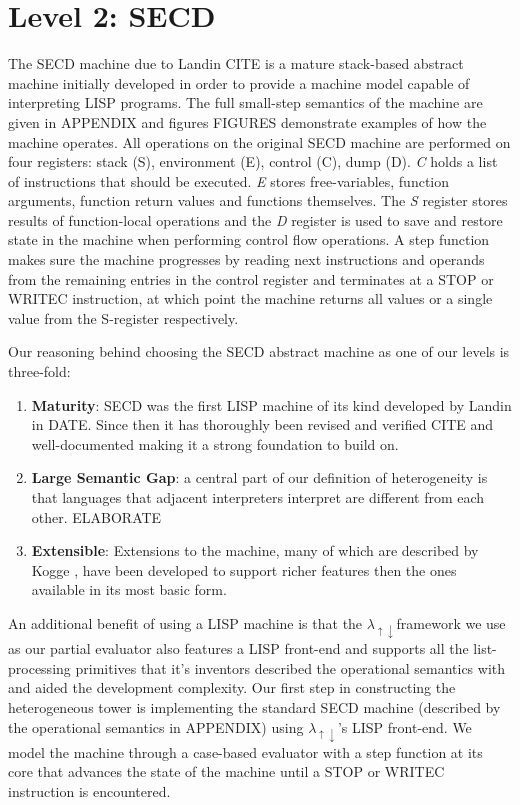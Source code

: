 \documentclass{article}
\theoremstyle{definition}
\newcommand{\mslang}{$\lambda_{\uparrow\downarrow}$}
\begin{document}
\section{Level 2: SECD}
The SECD machine due to Landin CITE is a mature stack-based abstract machine initially developed in order to provide a machine model capable of interpreting LISP programs. The full small-step semantics of the machine are given in APPENDIX and figures FIGURES demonstrate examples of how the machine operates. All operations on the original SECD machine are performed on four registers: stack (S), environment (E), control (C), dump (D). \textit{C} holds a list of instructions that should be executed. \textit{E} stores free-variables, function arguments, function return values and functions themselves. The \textit{S} register stores results of function-local operations and the \textit{D} register is used to save and restore state in the machine when performing control flow operations. A step function makes sure the machine progresses by reading next instructions and operands from the remaining entries in the control register and terminates at a STOP or WRITEC instruction, at which point the machine returns all values or a single value from the S-register respectively.

Our reasoning behind choosing the SECD abstract machine as one of our levels is three-fold:
\begin{enumerate}
	\item \textbf{Maturity}: SECD was the first LISP machine of its kind developed by Landin in DATE. Since then it has thoroughly been revised and verified CITE and well-documented making it a strong foundation to build on.
	\item \textbf{Large Semantic Gap}: a central part of our definition of heterogeneity is that languages that adjacent interpreters interpret are different from each other. ELABORATE
	\item \textbf{Extensible}: Extensions to the machine, many of which are described by Kogge \cite{kogge1990architecture}, have been developed to support richer features then the ones available in its most basic form.
\end{enumerate}
An additional benefit of using a LISP machine is that the \mslang framework we use as our partial evaluator also features a LISP front-end and supports all the list-processing primitives that it's inventors described the operational semantics with and aided the development complexity. Our first step in constructing the heterogeneous tower is implementing the standard SECD machine (described by the operational semantics in APPENDIX) using \mslang's LISP front-end. We model the machine through a case-based evaluator with a step function at its core that advances the state of the machine until a STOP or WRITEC instruction is encountered.
\end{document}
